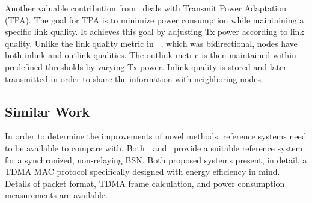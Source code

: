 Another valuable contribution from~\cite{relay:transmitpoweradaptation} deals with Transmit Power Adaptation (TPA). The goal for TPA is to minimize power consumption while maintaining a specific link quality. It achieves this goal by adjusting Tx power according to link quality. Unlike the link quality metric in ~\cite{routing:storeandforward}, which was bidirectional, nodes have both inlink and outlink qualities. The outlink metric is then maintained within predefined thresholds by varying Tx power. Inlink quality is stored and later transmitted in order to share the information with neighboring nodes.

\subsection{Similar Work}
In order to determine the improvements of novel methods, reference systems need to be available to compare with. Both~\cite{mac:tdma}~and~\cite{mac:lowdutycycle} provide a suitable reference system for a synchronized, non-relaying BSN. Both proposed systems present, in detail, a TDMA MAC protocol specifically designed with energy efficiency in mind. Details of packet format, TDMA frame calculation, and power consumption measurements are available.


